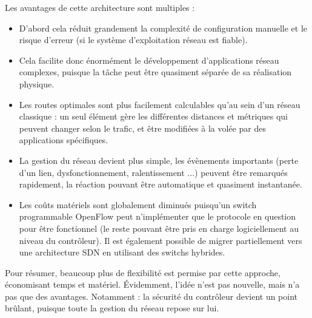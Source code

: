 Les avantages de cette architecture sont multiples :
\begin{itemize}
\item D'abord cela réduit grandement la complexité de configuration manuelle et le risque d'erreur (si le système d'exploitation réseau est fiable).
\item Cela facilite donc énormément le développement d'applications réseau complexes, puisque la tâche peut être quasiment séparée de sa réalisation physique.
\item Les routes optimales sont plus facilement calculables qu'au sein d'un réseau classique : un seul élément gère les différentes distances et métriques qui peuvent changer selon le trafic, et être modifiées à la volée par des applications spécifiques.
\item La gestion du réseau devient plus simple, les évènements importants (perte d'un lien, dysfonctionnement, ralentissement ...) peuvent être remarqués rapidement, la réaction pouvant être automatique et quasiment instantanée.
\item Les coûts matériels sont globalement diminués puisqu'un switch programmable OpenFlow peut n'implémenter que le protocole en question pour être fonctionnel (le reste pouvant être pris en charge logiciellement au niveau du contrôleur). Il est également possible de migrer partiellement vers une architecture SDN en utilisant des switchs hybrides.
\end{itemize}

Pour résumer, beaucoup plus de flexibilité est permise par cette approche, économisant temps et matériel. Évidemment, l'idée n'est pas nouvelle, mais n'a pas que des avantages. Notamment : la sécurité du contrôleur devient un point brûlant, puisque toute la gestion du réseau repose sur lui.